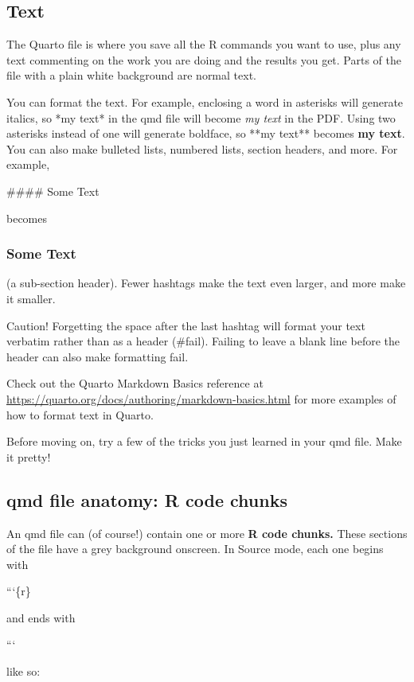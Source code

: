 \documentclass[
  letterpaper,
  DIV=11,
  numbers=noendperiod]{scrreprt}
\theoremstyle{remark}
\begin{document}
\subsection{Text}\label{text}

The Quarto file is where you save all the R commands you want to use,
plus any text commenting on the work you are doing and the results you
get. Parts of the file with a plain white background are normal text.

You can format the text. For example, enclosing a word in asterisks will
generate italics, so *my text* in the qmd file will become \emph{my
text} in the PDF. Using two asterisks instead of one will generate
boldface, so **my text** becomes \textbf{my text}. You can also make
bulleted lists, numbered lists, section headers, and more. For example,

\#\#\#\# Some Text

becomes

\subsubsection{Some Text}\label{some-text}

(a sub-section header). Fewer hashtags make the text even larger, and
more make it smaller.

Caution! Forgetting the space after the last hashtag will format your
text verbatim rather than as a header (\#fail). Failing to leave a blank
line before the header can also make formatting fail.

Check out the Quarto Markdown Basics reference at
\url{https://quarto.org/docs/authoring/markdown-basics.html} for more
examples of how to format text in Quarto.

Before moving on, try a few of the tricks you just learned in your qmd
file. Make it pretty!

\subsection{qmd file anatomy: R code
chunks}\label{qmd-file-anatomy-r-code-chunks}

An qmd file can (of course!) contain one or more \textbf{R code chunks.}
These sections of the file have a grey background onscreen. In Source
mode, each one begins with

```\{r\}

and ends with

```

like so:
\end{document}
